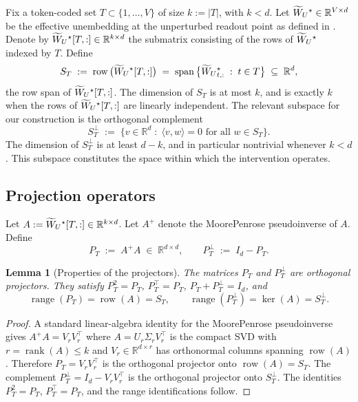\documentclass[11pt,letterpaper]{article}
\theoremstyle{plain}
\newtheorem{lemma}[theorem]{Lemma}
\theoremstyle{definition}
\DeclareMathOperator{\range}{range}
\DeclareMathOperator{\rank}{rank}
\DeclareMathOperator{\rowsp}{row}
\DeclareMathOperator{\spann}{span}
\newcommand{\R}{\mathbb{R}}
\newcommand{\1}{\mathbf{1}}
\newcommand{\WUt}{\widetilde{W}_{U}\mathchoice{}{}{}{}}
\newcommand{\PT}{P_{T}}
\newcommand{\PTperp}{P_{T}^{\perp}}
\begin{document}
Fix a token-coded set $T \subset \{1, \dots, V\}$ of size $k := |T|$, with $k < d$. Let $\WUt^\star \in \R^{V \times d}$ be the effective unembedding at the unperturbed readout point as defined in . Denote by $\WUt^\star[T,:] \in \R^{k \times d}$ the submatrix consisting of the rows of $\WUt^\star$ indexed by $T$. Define
\begin{equation}
S_T \;:=\; \rowsp\big(\WUt^\star[T,:]\big) \;=\; \spann\big\{ \WUt^\star_{t,:}\; :\; t \in T \big\} \;\subseteq\; \R^d,
\label{eq:ST}
\end{equation}
the row span of $\WUt^\star[T,:]$. The dimension of $S_T$ is at most $k$, and is exactly $k$ when the rows of $\WUt^\star[T,:]$ are linearly independent. The relevant subspace for our construction is the orthogonal complement
\begin{equation}
S_T^{\perp} \;:=\; \{ v \in \R^d \;:\; \langle v, w \rangle = 0 \text{ for all } w \in S_T \}.
\label{eq:STperp}
\end{equation}
The dimension of $S_T^\perp$ is at least $d - k$, and in particular nontrivial whenever $k < d$. This subspace constitutes the space within which the intervention operates.

\subsection{Projection operators}

Let $A := \WUt^\star[T,:] \in \R^{k \times d}$. Let $A^+$ denote the Moore\textendash Penrose pseudoinverse of $A$. Define
\begin{equation}
\PT \;:=\; A^+ A \;\in\; \R^{d \times d}, \qquad \PTperp \;:=\; I_d - \PT.
\label{eq:projectors}
\end{equation}

\begin{lemma}[Properties of the projectors]\label{lem:projectors}
The matrices $\PT$ and $\PTperp$ are orthogonal projectors. They satisfy $\PT^2 = \PT$, $\PT^\top = \PT$, $\PT + \PTperp = I_d$, and
\begin{equation}
\range(\PT) = \rowsp(A) = S_T, \qquad \range(\PTperp) = \ker(A) = S_T^\perp.
\label{eq:projectorimage}
\end{equation}
\end{lemma}

\begin{proof}
A standard linear-algebra identity for the Moore\textendash Penrose pseudoinverse gives $A^+ A = V_r V_r^\top$ where $A = U_r \Sigma_r V_r^\top$ is the compact SVD with $r = \rank(A) \leq k$ and $V_r \in \R^{d \times r}$ has orthonormal columns spanning $\rowsp(A)$. Therefore $\PT = V_r V_r^\top$ is the orthogonal projector onto $\rowsp(A) = S_T$. The complement $\PTperp = I_d - V_r V_r^\top$ is the orthogonal projector onto $S_T^\perp$. The identities $\PT^2 = \PT$, $\PT^\top = \PT$, and the range identifications follow.
\end{proof}
\end{document}
